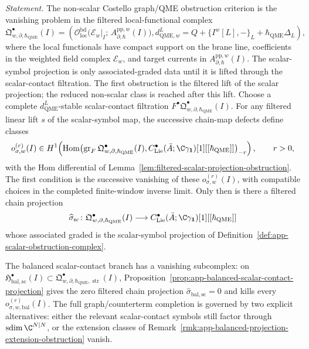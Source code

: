 \documentclass[11pt]{memoir}
\begin{document}
\begin{prob}
  \noindent
  \emph{Statement.}
  The non-scalar Costello graph/QME obstruction criterion is the vanishing problem in the
  filtered local-functional complex
  \[
    \mathfrak Q^\bullet_{w,\partial,\hbar_{\mathrm{QME}}}(I)
      =
      \left(
      \mathcal O_{\mathrm{loc}}^{\mathrm{bd}}\bigl(
	        \mathcal E_w|_I;\,A^{\mathrm{pp},w}_{\partial,\hbar}(I)\bigr),
	      d_{\mathrm{QME},w}^{L}=Q+\{I^w[L],-\}_{L}
        +\hbar_{\mathrm{QME}}\Delta_L
      \right),
  \]
  where the local functionals have compact support on the brane line,
  coefficients in the weighted field complex \(\mathcal E_w\), and
  target currents in \(A^{\mathrm{pp},w}_{\partial,\hbar}(I)\).  The
  scalar-symbol projection is only associated-graded data until it is
  lifted through the scalar-contact filtration.  The first
  obstruction is the filtered lift of the scalar projection; the reduced
  non-scalar class is reached after this lift.  Choose a complete
  \(d_{\mathrm{QME}}^{L}\)-stable scalar-contact filtration
  \(F^\bullet\mathfrak Q^\bullet_{w,\partial,\hbar_{\mathrm{QME}}}(I)\).  For any
  filtered linear lift \(s\) of the scalar-symbol map, the successive
  chain-map defects define classes
  \[
    o_{\sigma,w}^{(r)}(I)\in
    H^1\!\left(
      \operatorname{Hom}\bigl(
        \operatorname{gr}_{F}
        \mathfrak Q^\bullet_{w,\partial,\hbar_{\mathrm{QME}}}(I),
	        C^\bullet_{\mathrm{Lie}}(\bar A;\C\gamma_{\mathbf 1})[1][[\hbar_{\mathrm{QME}}]]
      \bigr)_{-r}
    \right),\qquad r>0,
  \]
  with the Hom differential of
  Lemma~\ref{lem:filtered-scalar-projection-obstruction}.  The first
  condition is the successive vanishing of these
  \(o_{\sigma,w}^{(r)}(I)\), with compatible choices in the completed
  finite-window inverse limit.  Only then is there a filtered chain
  projection
  \[
    \widehat\sigma_{\mathrm{sc}}\colon
    \mathfrak Q^\bullet_{w,\partial,\hbar_{\mathrm{QME}}}(I)
      \longrightarrow
	    C^\bullet_{\mathrm{Lie}}(\bar A;\C\gamma_{\mathbf 1})[1][[\hbar_{\mathrm{QME}}]]
  \]
  whose associated graded is the scalar-symbol projection of
  Definition~\ref{def:app-scalar-obstruction-complex}.

  The balanced scalar-contact branch has a vanishing subcomplex:
  on
  \(\mathfrak H^\bullet_{\mathrm{bal,sc}}(I)\subset
  \mathfrak Q^\bullet_{w,\partial,\hbar_{\mathrm{QME}},\operatorname{str}}(I)\),
  Proposition~\ref{prop:app-balanced-scalar-contact-projection} gives
  the zero filtered chain projection
  \(\widehat\sigma_{\mathrm{bal,sc}}=0\) and kills every
  \(o_{\sigma,w,\mathrm{bal}}^{(r)}(I)\).  The full graph/counterterm
  completion is governed by two explicit alternatives: either the
  relevant scalar-contact symbols still factor through
  \(\operatorname{sdim}\C^{N|N}\), or the extension classes of
  Remark~\ref{rmk:app-balanced-projection-extension-obstruction}
  vanish.


\end{prob}
\end{document}
